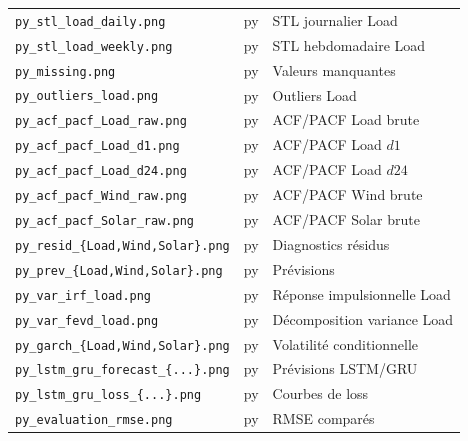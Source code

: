 {\begin{longtable}{lll}
\texttt{py\_stl\_load\_daily.png} & py & STL journalier Load \\
\texttt{py\_stl\_load\_weekly.png} & py & STL hebdomadaire Load \\
\texttt{py\_missing.png} & py & Valeurs manquantes \\
\texttt{py\_outliers\_load.png} & py & Outliers Load \\
\texttt{py\_acf\_pacf\_Load\_raw.png} & py & ACF/PACF Load brute \\
\texttt{py\_acf\_pacf\_Load\_d1.png} & py & ACF/PACF Load $d1$ \\
\texttt{py\_acf\_pacf\_Load\_d24.png} & py & ACF/PACF Load $d24$ \\
\texttt{py\_acf\_pacf\_Wind\_raw.png} & py & ACF/PACF Wind brute \\
\texttt{py\_acf\_pacf\_Solar\_raw.png} & py & ACF/PACF Solar brute \\
\texttt{py\_resid\_\{Load,Wind,Solar\}.png} & py & Diagnostics résidus \\
\texttt{py\_prev\_\{Load,Wind,Solar\}.png} & py & Prévisions \\
\texttt{py\_var\_irf\_load.png} & py & Réponse impulsionnelle Load \\
\texttt{py\_var\_fevd\_load.png} & py & Décomposition variance Load \\
\texttt{py\_garch\_\{Load,Wind,Solar\}.png} & py & Volatilité conditionnelle \\
\texttt{py\_lstm\_gru\_forecast\_\{...\}.png} & py & Prévisions LSTM/GRU \\
\texttt{py\_lstm\_gru\_loss\_\{...\}.png} & py & Courbes de loss \\
\texttt{py\_evaluation\_rmse.png} & py & RMSE comparés \\
\end{longtable}
}

